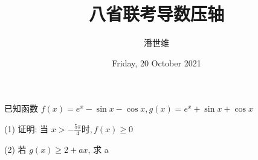 \documentclass[a4paper,12pt]{article}
\begin{document}
\title {八省联考导数压轴}
\author{潘世维}
\date{Friday, 20 October 2021}
\maketitle

已知函数 $ f(x)=e^{x}-\sin x-\cos x, g(x)=e^{x}+\sin x+\cos x$


(1) 证明: 当 $ x>-\frac{5 \pi}{4}  时,  f(x) \geq 0 $



(2) 若 $ g(x) \geq 2+a x $, 求  a 
\begin{flushleft}
~\\


\end{flushleft}
\end{document}
